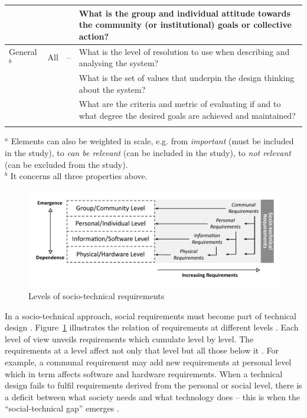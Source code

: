 \begin{table}
\begin{tabular}{>{\raggedright}p{2cm}>{\raggedright}p{1.6cm}>{\raggedright}p{1.7cm}p{6.2cm}}
   &&& What is the group and individual attitude towards the community (or institutional) goals or collective action? \\ \hline\noalign{\smallskip}
General $^b$ & All  &  --  & What is the level of resolution to use when describing and analysing the system? \\
&&& What is the set of values that underpin the design thinking about the system? \\
&&& What are the criteria and metric of evaluating if and to what degree the desired goals are achieved and maintained? \\
\noalign{\smallskip}\hline\noalign{\smallskip}
\end{tabular}
$^a$ Elements can also be weighted in scale, e.g. from \textit{important} (must be included in the study), to \textit{can be relevant} (can be included in the study), to \textit{not relevant} (can be excluded from the study).\\
$^b$ It concerns all three properties above. 
\end{table}
%
%
\begin{figure}
\sidecaption
\includegraphics[scale=.68]{img/sts_requirements.pdf}
\caption{Levels of socio-technical requirements \cite{Whitworth2009a}}
\label{fig:sts_requirements} 
\end{figure}
% 
%
In a socio-technical approach, social requirements must become part of technical design \cite{Whitworth2014}. Figure~\ref{fig:sts_requirements} illustrates the relation of requirements at different levels \cite{Whitworth2009a}. Each level of view unveils requirements which cumulate level by level. The requirements at a level affect not only that level but all those below it \cite{Whitworth2009a}. For example, a communal requirement may add new requirements at personal level which in term affects software and hardware requirements. When a technical design fails to fulfil requirements derived from the personal or social level, there is a deficit  between  what  society  needs  and  what technology does -- this is when the ``social-technical  gap''  emerges \cite{Whitworth2014}. 

